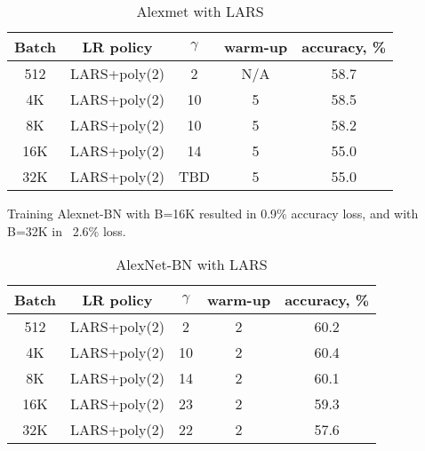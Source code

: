 \documentclass{article} %
\begin{document}
\begin{table}[htb!]
  \caption{ Alexmet with LARS }
  \centering
  \vspace{3pt}
  \begin{tabular}{|c|c|c|c|c |}
  \hline Batch & LR policy   & $\gamma$  & warm-up & accuracy, \% \\
  \hline  512 & LARS+poly(2)  &  2  & N/A  &  58.7 \\
  \hline  4K  & LARS+poly(2)  & 10  & 5    &  58.5 \\
  \hline  8K  & LARS+poly(2)  & 10  & 5    &  58.2 \\
  \hline 16K  & LARS+poly(2)  & 14  & 5    &  55.0 \\
  \hline 32K  & LARS+poly(2)  & TBD & 5    &  55.0 \\
  \hline
  \end{tabular}
\end{table}

Training Alexnet-BN with B=16K resulted in 0.9\% accuracy loss, and with B=32K in  ~2.6\% loss. 

\begin{table}[htb!]
  \caption{ AlexNet-BN with LARS}
  \centering
  \vspace{3pt}
  \begin{tabular}{|c|c|c|c|c |}
  \hline Batch & LR policy    & $\gamma$  & warm-up & accuracy, \% \\
  \hline  512 & LARS+poly(2) & 2   & 2 & 60.2 \\
  \hline  4K  & LARS+poly(2) & 10  & 2 & 60.4 \\
  \hline  8K  & LARS+poly(2) & 14  & 2 & 60.1 \\
  \hline 16K  & LARS+poly(2) & 23  & 2 & 59.3 \\
  \hline 32K  & LARS+poly(2) & 22  & 2 & 57.6 \\
  \hline
  \end{tabular}
\end{table}


\fi
\end{document}
